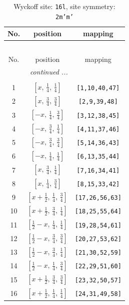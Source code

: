 \documentclass[fleqn,8pt]{jsarticle}
\begin{document}
\renewcommand{\arraystretch}{1.2}
\begin{longtable}{ccc}
\caption{Wyckoff site: {\tt 16l}, site symmetry: {\tt 2m'm'}}
 \\
 \hline \hline
No. & position & mapping \\ \hline \endfirsthead

\multicolumn{2}{l}{\tablename\ \thetable{}} \\
 \hline \hline
No. & position & mapping \\ \hline \endhead

 \hline \hline
\multicolumn{2}{r}{\footnotesize\it continued ...} \\ \endfoot

 \hline \hline
\multicolumn{2}{r}{} \\ \endlastfoot

1 & $\left[ x,\, \frac{1}{4},\, \frac{1}{4} \right]$ & {\tt [1,10,40,47]} \\ \hline
2 & $\left[ x,\, \frac{3}{4},\, \frac{3}{4} \right]$ & {\tt [2,9,39,48]} \\ \hline
3 & $\left[ - x,\, \frac{1}{4},\, \frac{3}{4} \right]$ & {\tt [3,12,38,45]} \\ \hline
4 & $\left[ - x,\, \frac{3}{4},\, \frac{1}{4} \right]$ & {\tt [4,11,37,46]} \\ \hline
5 & $\left[ - x,\, \frac{3}{4},\, \frac{3}{4} \right]$ & {\tt [5,14,36,43]} \\ \hline
6 & $\left[ - x,\, \frac{1}{4},\, \frac{1}{4} \right]$ & {\tt [6,13,35,44]} \\ \hline
7 & $\left[ x,\, \frac{3}{4},\, \frac{1}{4} \right]$ & {\tt [7,16,34,41]} \\ \hline
8 & $\left[ x,\, \frac{1}{4},\, \frac{3}{4} \right]$ & {\tt [8,15,33,42]} \\ \hline
9 & $\left[ x + \frac{1}{2},\, \frac{1}{4},\, \frac{3}{4} \right]$ & {\tt [17,26,56,63]} \\ \hline
10 & $\left[ x + \frac{1}{2},\, \frac{3}{4},\, \frac{1}{4} \right]$ & {\tt [18,25,55,64]} \\ \hline
11 & $\left[ \frac{1}{2} - x,\, \frac{1}{4},\, \frac{1}{4} \right]$ & {\tt [19,28,54,61]} \\ \hline
12 & $\left[ \frac{1}{2} - x,\, \frac{3}{4},\, \frac{3}{4} \right]$ & {\tt [20,27,53,62]} \\ \hline
13 & $\left[ \frac{1}{2} - x,\, \frac{3}{4},\, \frac{1}{4} \right]$ & {\tt [21,30,52,59]} \\ \hline
14 & $\left[ \frac{1}{2} - x,\, \frac{1}{4},\, \frac{3}{4} \right]$ & {\tt [22,29,51,60]} \\ \hline
15 & $\left[ x + \frac{1}{2},\, \frac{3}{4},\, \frac{3}{4} \right]$ & {\tt [23,32,50,57]} \\ \hline
16 & $\left[ x + \frac{1}{2},\, \frac{1}{4},\, \frac{1}{4} \right]$ & {\tt [24,31,49,58]} \\
\end{longtable}
\end{document}
